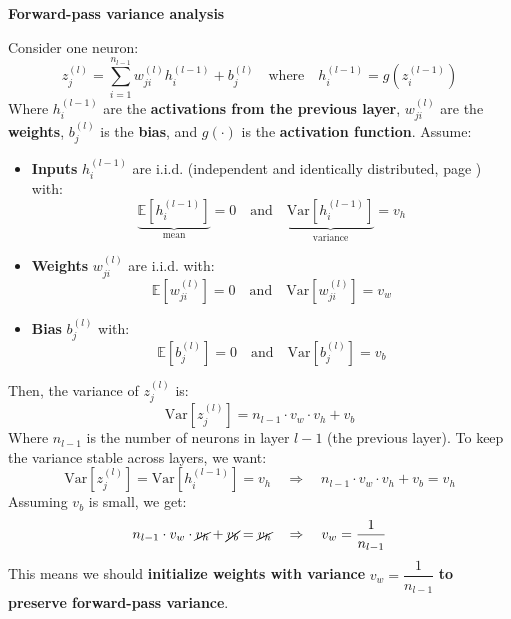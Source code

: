 \begin{flushleft}
    \textcolor{Green3}{ \textbf{Forward-pass variance analysis}}
\end{flushleft}
Consider one neuron:
\begin{equation*}
    z_j^{(l)} = \sum_{i=1}^{n_{l-1}} w_{ji}^{(l)} h_i^{(l-1)} + b_j^{(l)} \quad \text{where} \quad h_i^{(l-1)} = g\left(z_i^{(l-1)}\right)
\end{equation*}
Where $h_i^{(l-1)}$ are the \textbf{activations from the previous layer}, $w_{ji}^{(l)}$ are the \textbf{weights}, $b_j^{(l)}$ is the \textbf{bias}, and $g(\cdot)$ is the \textbf{activation function}. Assume:
\begin{itemize}
    \item \textbf{Inputs} $h_i^{(l-1)}$ are i.i.d. (independent and identically distributed, page \pageref{def:iid}) with:
    \begin{equation*}
        \underbrace{\mathbb{E}\left[h_i^{(l-1)}\right]}_{\text{mean}} = 0 \quad \text{and} \quad \underbrace{\mathrm{Var}\left[h_i^{(l-1)}\right]}_{\text{variance}} = v_h
    \end{equation*}
    \item \textbf{Weights} $w_{ji}^{(l)}$ are i.i.d. with:
    \begin{equation*}
        \mathbb{E}\left[w_{ji}^{(l)}\right] = 0 \quad \text{and} \quad \mathrm{Var}\left[w_{ji}^{(l)}\right] = v_w
    \end{equation*}
    \item \textbf{Bias} $b_j^{(l)}$ with:
    \begin{equation*}
        \mathbb{E}\left[b_j^{(l)}\right] = 0 \quad \text{and} \quad \mathrm{Var}\left[b_j^{(l)}\right] = v_b
    \end{equation*}
\end{itemize}
Then, the variance of $z_j^{(l)}$ is:
\begin{equation*}
    \mathrm{Var}\left[z_j^{(l)}\right] = n_{l-1} \cdot v_w \cdot v_h + v_b
\end{equation*}
Where $n_{l-1}$ is the number of neurons in layer $l-1$ (the previous layer). To keep the variance stable across layers, we want:
\begin{equation*}
    \mathrm{Var}\left[z_j^{(l)}\right] = \mathrm{Var}\left[h_i^{(l-1)}\right] = v_h \quad \Rightarrow \quad n_{l-1} \cdot v_w \cdot v_h + v_b = v_h
\end{equation*}
Assuming $v_b$ is small, we get:
\begin{equation}\label{eq:forward-variance}
    n_{l-1} \cdot v_w \cdot \cancel{v_h} + \cancel{v_b} = \cancel{v_h} \quad \Rightarrow \quad v_w = \dfrac{1}{n_{l-1}}
\end{equation}
This means we should \textbf{initialize weights with variance} $v_w = \dfrac{1}{n_{l-1}}$ \textbf{to preserve forward-pass variance}.

